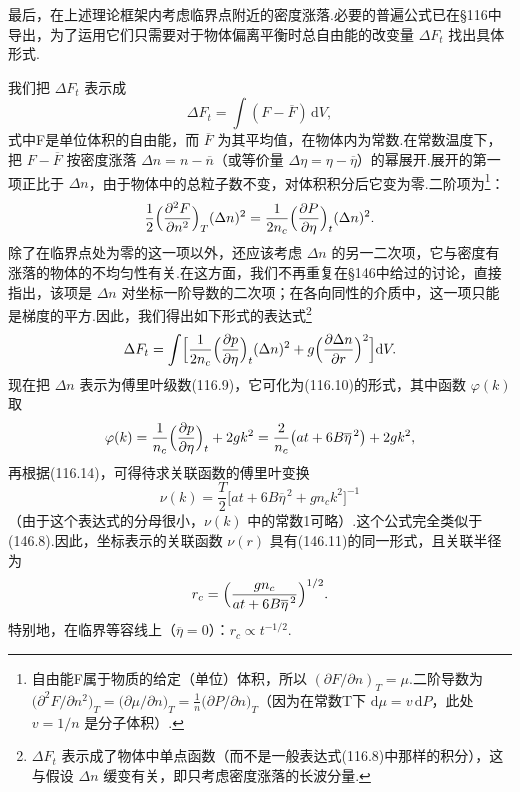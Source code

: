 最后，在上述理论框架内考虑临界点附近的密度涨落.必要的普遍公式已在§116中导出，为了运用它们只需要对于物体偏离平衡时总自由能的改变量 $\Delta F_t$ 找出具体形式.

我们把 $\Delta F_t$ 表示成
\begin{equation*}
  \Delta F_t=\int(F-\overline{F})\,\mathrm{d}V,
\end{equation*}
式中F是单位体积的自由能，而 $\overline{F}$ 为其平均值，在物体内为常数.在常数温度下，把 $F-\overline{F}$ 按密度涨落 $\Delta n=n-\overline{n}$（或等价量 $\Delta\eta=\eta-\overline{\eta}$）的幂展开.展开的第一项正比于 $\Delta n$，由于物体中的总粒子数不变，对体积积分后它变为零.二阶项为\footnote{自由能F属于物质的给定（单位）体积，所以 $(\partial F/\partial n)_T=\mu$.二阶导数为 $\bigl(\partial^2 F/\partial n^2\bigr)_T=\bigl(\partial\mu/\partial n\bigr)_T=\frac{1}{n}\bigl(\partial P/\partial n\bigr)_T$（因为在常数T下 $\mathrm{d}\mu=v\,\mathrm{d}P$，此处 $v=1/n$ 是分子体积）.}：
\begin{equation*}
  \frac{1}{2}\Bigl(\frac{\partial^2F}{\partial n^2}\Bigr)_T(\Delta n)^2
  =\frac{1}{2n_c}\Bigl(\frac{\partial P}{\partial\eta}\Bigr)_t(\Delta n)^2.
\end{equation*}
除了在临界点处为零的这一项以外，还应该考虑 $\Delta n$ 的另一二次项，它与密度有涨落的物体的不均匀性有关.在这方面，我们不再重复在§146中给过的讨论，直接指出，该项是 $\Delta n$ 对坐标一阶导数的二次项；在各向同性的介质中，这一项只能是梯度的平方.因此，我们得出如下形式的表达式\footnote{$\Delta F_t$ 表示成了物体中单点函数（而不是一般表达式(116.8)中那样的积分），这与假设 $\Delta n$ 缓变有关，即只考虑密度涨落的长波分量.}
\begin{equation}
  \Delta F_t=\int\Bigl[\frac{1}{2n_c}
  \Bigl(\frac{\partial p}{\partial\eta}\Bigr)_t(\Delta n)^2
  +g\Bigl(\frac{\partial\Delta n}{\partial r}\Bigr)^2\Bigr]\mathrm{d}V.
\end{equation}
现在把 $\Delta n$ 表示为傅里叶级数(116.9)，它可化为(116.10)的形式，其中函数 $\varphi(k)$ 取
\begin{equation*}
  \varphi(k)=\frac{1}{n_c}\Bigl(\frac{\partial p}{\partial\eta}\Bigr)_t+2gk^2
  =\frac{2}{n_c}\bigl(at+6B\overline{\eta}^{\,2}\bigr)+2gk^2,
\end{equation*}
再根据(116.14)，可得待求关联函数的傅里叶变换
\begin{equation}
  \nu(k)=\frac{T}{2}\bigl[at+6B\overline{\eta}^{\,2}+gn_ck^2\bigr]^{-1}
\end{equation}
（由于这个表达式的分母很小，$\nu(k)$ 中的常数1可略）.这个公式完全类似于(146.8).因此，坐标表示的关联函数 $\nu(r)$ 具有(146.11)的同一形式，且关联半径为
\begin{equation}
  r_c=\Bigl(\frac{gn_c}{at+6B\overline{\eta}^{\,2}}\Bigr)^{1/2}.
\end{equation}
特别地，在临界等容线上（$\overline{\eta}=0$）：$r_c\propto t^{-1/2}$.


